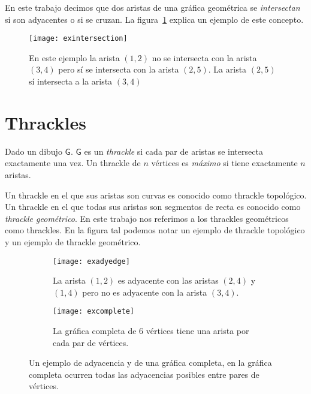 En este trabajo decimos que dos aristas de una gráfica geométrica se \emph{intersectan}
si son adyacentes o si se cruzan. La figura~\ref{fig:exintersection} explica un ejemplo de este concepto.
\begin{figure}[htpb]
  \centering
  \texttt{[image: exintersection]}
  \caption{En este ejemplo la arista $(1,2)$ no se intersecta con la arista $(3,4)$
  pero sí se intersecta con la arista $(2,5)$. La arista $(2,5)$ sí intersecta a la arista
  $(3,4)$}
  \label{fig:exintersection}
\end{figure}

\section{Thrackles}
Dado un dibujo $\mathsf{G}$. $\mathsf{G}$ es un \emph{thrackle} si cada par de aristas
se intersecta exactamente una vez. Un thrackle de $n$ vértices
es \emph{máximo} si tiene exactamente $n$ aristas.

Un thrackle en el que sus aristas son curvas es conocido como thrackle topológico.
Un thrackle en el que todas sus aristas son segmentos de recta es conocido como
\emph{thrackle geométrico}. En este trabajo nos referimos a los thrackles geométricos
como thrackles. En la figura tal podemos notar un ejemplo de thrackle topológico y
un ejemplo de thrackle geométrico.

\begin{figure}[htb]
  \centering
\begin{subfigure}[h]{.4\textwidth}
  \centering
  \texttt{[image: exadyedge]}
  \caption{La arista $(1,2)$ es adyacente con las aristas $(2,4)$ y $(1,4)$ pero
  no es adyacente con la arista $(3,4)$.}
  \label{fig:exadyedge}
\end{subfigure}\hfill%
\begin{subfigure}[h]{.4\textwidth}
  \centering
  \texttt{[image: excomplete]}
  \caption{La gráfica completa de 6 vértices tiene una arista por cada par de vértices.}
  \label{fig:excomplete}
\end{subfigure}
\caption{Un ejemplo de adyacencia y de una gráfica completa, en la gráfica completa
ocurren todas las adyacencias posibles entre pares de vértices.}
\label{fig:exadycomplete}
\end{figure}

